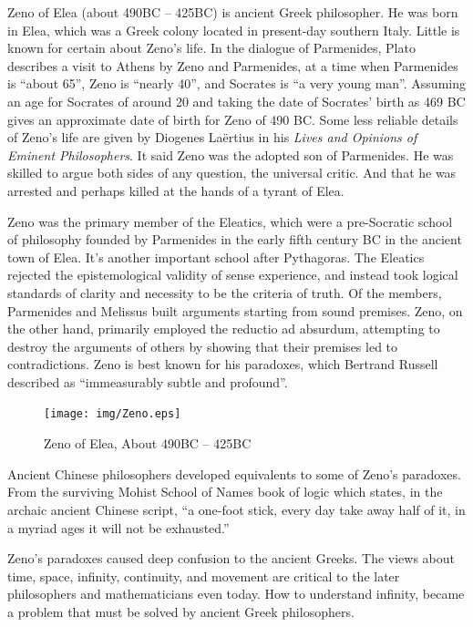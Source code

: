 \documentclass{article}
\begin{document}
Zeno of Elea (about 490BC -- 425BC) is ancient Greek philosopher.
He was born in Elea, which was a Greek colony located in present-day southern Italy. Little is known for certain about Zeno's life. In the dialogue of Parmenides, Plato describes a visit to Athens by Zeno and Parmenides, at a time when Parmenides is ``about 65'', Zeno is ``nearly 40'', and Socrates is ``a very young man''. Assuming an age for Socrates of around 20 and taking the date of Socrates' birth as 469 BC gives an approximate date of birth for Zeno of 490 BC. Some less reliable details of Zeno's life are given by Diogenes Laërtius in his {\em Lives and Opinions of Eminent Philosophers}. It said Zeno was the adopted son of Parmenides. He was skilled to argue both sides of any question, the universal critic. And that he was arrested and perhaps killed at the hands of a tyrant of Elea\cite{HanXueTao16}.

Zeno was the primary member of the Eleatics, which were a pre-Socratic school of philosophy founded by Parmenides in the early fifth century BC in the ancient town of Elea. It's another important school after Pythagoras. The Eleatics rejected the epistemological validity of sense experience, and instead took logical standards of clarity and necessity to be the criteria of truth. Of the members, Parmenides and Melissus built arguments starting from sound premises. Zeno, on the other hand, primarily employed the reductio ad absurdum, attempting to destroy the arguments of others by showing that their premises led to contradictions. Zeno is best known for his paradoxes, which Bertrand Russell described as ``immeasurably subtle and profound''.

\begin{figure}[htbp]
 \centering
 \texttt{[image: img/Zeno.eps]}
 \captionsetup{labelformat=empty}
 \caption{Zeno of Elea, About 490BC -- 425BC}
 \label{fig:Zeno-of-Elea}
\end{figure}

Ancient Chinese philosophers developed equivalents to some of Zeno's paradoxes. From the surviving Mohist School of Names book of logic which states, in the archaic ancient Chinese script, ``a one-foot stick, every day take away half of it, in a myriad ages it will not be exhausted.''

Zeno's paradoxes caused deep confusion to the ancient Greeks. The views about time, space, infinity, continuity, and movement are critical to the later philosophers and mathematicians even today. How to understand infinity, became a problem that must be solved by ancient Greek philosophers.
\end{document}
